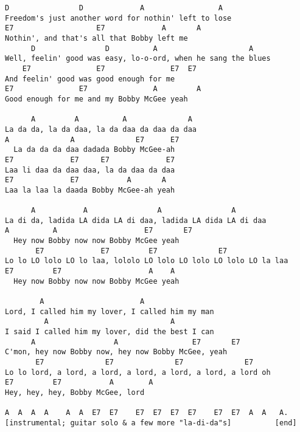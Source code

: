 \begin{verbatim}
D                D             A                 A
Freedom's just another word for nothin' left to lose
E7                   E7             A       A
Nothin', and that's all that Bobby left me
      D                D          A                     A
Well, feelin' good was easy, lo-o-ord, when he sang the blues
    E7               E7               E7  E7
And feelin' good was good enough for me
E7               E7               A         A
Good enough for me and my Bobby McGee yeah

      A         A          A              A
La da da, la da daa, la da daa da daa da daa
A              A              E7      E7
  La da da da daa dadada Bobby McGee-ah
E7             E7     E7             E7
Laa li daa da daa daa, la da daa da daa
E7             E7           A       A
Laa la laa la daada Bobby McGee-ah yeah

      A           A                A                A
La di da, ladida LA dida LA di daa, ladida LA dida LA di daa
A          A                    E7       E7
  Hey now Bobby now now Bobby McGee yeah
       E7             E7         E7              E7
Lo lo LO lolo LO lo laa, lololo LO lolo LO lolo LO lolo LO la laa
E7         E7                    A    A
  Hey now Bobby now now Bobby McGee yeah

        A                      A
Lord, I called him my lover, I called him my man
         A                            A
I said I called him my lover, did the best I can
      A                  A                 E7       E7
C'mon, hey now Bobby now, hey now Bobby McGee, yeah
       E7              E7              E7              E7
Lo lo lord, a lord, a lord, a lord, a lord, a lord, a lord oh
E7         E7           A        A
Hey, hey, hey, Bobby McGee, lord

A  A  A  A    A  A  E7  E7    E7  E7  E7  E7    E7  E7  A  A   A.
[instrumental; guitar solo & a few more "la-di-da"s]          [end]
\end{verbatim}